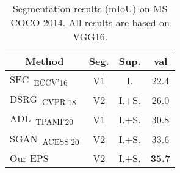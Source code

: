 \begin{table}[]
\centering
{\small
\begin{tabular}{@{}lccc@{}}
\toprule
\multicolumn{1}{c}{Method}                                                  &Seg.       &Sup.   & \multicolumn{1}{c}{val}           \\ \midrule
\multicolumn{1}{l}{SEC~\cite{kolesnikov2016seed}\textsubscript{ECCV'16}}    & V1        &I.     & \multicolumn{1}{c}{22.4}          \\
\multicolumn{1}{l}{DSRG~\cite{huang2018weakly}\textsubscript{CVPR'18}}      & V2        &I.+S.  & \multicolumn{1}{c}{26.0}          \\
\multicolumn{1}{l}{ADL~\cite{choe2020attention}\textsubscript{TPAMI'20}}    & V1        &I.+S.  & \multicolumn{1}{c}{30.8}          \\
\multicolumn{1}{l}{SGAN~\cite{yao2020saliency}\textsubscript{ACESS'20}}     & V2        &I.+S.  & \multicolumn{1}{c}{33.6}          \\ \midrule
\multicolumn{1}{l}{Our EPS}                                                 & V2        &I.+S.  & \multicolumn{1}{c}{\textbf{35.7}} \\ \bottomrule
\end{tabular}
}
\vspace{2mm}
\caption{Segmentation results (mIoU) on MS COCO 2014. All results are based on VGG16.}\vspace{-2mm}
\label{tab:seg_quantitative_coco}
\end{table}